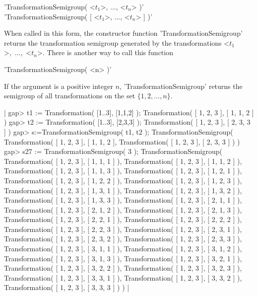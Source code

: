 
'TransformationSemigroup( <$t_1$>, ..., <$t_n$> )' \\
'TransformationSemigroup( [ <$t_1$>, ..., <$t_n$> ] )' 

When called in this form, the constructor function 
'Trans\-for\-mation\-Semi\-group' returns the 
transformation semigroup generated by the transformations 
<$t_1$>,~...,~<$t_n$>. There is another way to call this function\:\

'TransformationSemigroup( <n> )' 

If the argument is a positive integer $n$, 
'Trans\-for\-mation\-Semi\-group' returns the semigroup of all 
transformations on the set $\{1,2, \dots , n\}$.

|  gap> t1 := Transformation( [1..3], [1,1,2] );
  Transformation( [ 1, 2, 3 ], [ 1, 1, 2 ] )
  gap> t2 := Transformation( [1..3], [2,3,3] );
  Transformation( [ 1, 2, 3 ], [ 2, 3, 3 ] )
  gap> s:=TransformationSemigroup( t1, t2 );
  TransformationSemigroup( Transformation( [ 1, 2, 3 ],
  [ 1, 1, 2 ], Transformation( [ 1, 2, 3 ], [ 2, 3, 3 ] ) )
  gap> s27 := TransformationSemigroup( 3 );
  TransformationSemigroup( Transformation( [ 1, 2, 3 ], 
  [ 1, 1, 1 ] ), Transformation( [ 1, 2, 3 ], 
  [ 1, 1, 2 ] ), Transformation( [ 1, 2, 3 ], 
  [ 1, 1, 3 ] ), Transformation( [ 1, 2, 3 ], 
  [ 1, 2, 1 ] ), Transformation( [ 1, 2, 3 ], 
  [ 1, 2, 2 ] ), Transformation( [ 1, 2, 3 ], 
  [ 1, 2, 3 ] ), Transformation( [ 1, 2, 3 ], 
  [ 1, 3, 1 ] ), Transformation( [ 1, 2, 3 ], 
  [ 1, 3, 2 ] ), Transformation( [ 1, 2, 3 ], 
  [ 1, 3, 3 ] ), Transformation( [ 1, 2, 3 ], 
  [ 2, 1, 1 ] ), Transformation( [ 1, 2, 3 ], 
  [ 2, 1, 2 ] ), Transformation( [ 1, 2, 3 ], 
  [ 2, 1, 3 ] ), Transformation( [ 1, 2, 3 ], 
  [ 2, 2, 1 ] ), Transformation( [ 1, 2, 3 ], 
  [ 2, 2, 2 ] ), Transformation( [ 1, 2, 3 ], 
  [ 2, 2, 3 ] ), Transformation( [ 1, 2, 3 ], 
  [ 2, 3, 1 ] ), Transformation( [ 1, 2, 3 ], 
  [ 2, 3, 2 ] ), Transformation( [ 1, 2, 3 ], 
  [ 2, 3, 3 ] ), Transformation( [ 1, 2, 3 ], 
  [ 3, 1, 1 ] ), Transformation( [ 1, 2, 3 ], 
  [ 3, 1, 2 ] ), Transformation( [ 1, 2, 3 ], 
  [ 3, 1, 3 ] ), Transformation( [ 1, 2, 3 ], 
  [ 3, 2, 1 ] ), Transformation( [ 1, 2, 3 ], 
  [ 3, 2, 2 ] ), Transformation( [ 1, 2, 3 ], 
  [ 3, 2, 3 ] ), Transformation( [ 1, 2, 3 ], 
  [ 3, 3, 1 ] ), Transformation( [ 1, 2, 3 ], 
  [ 3, 3, 2 ] ), Transformation( [ 1, 2, 3 ], [ 3, 3, 3 ] ) ) 
|

